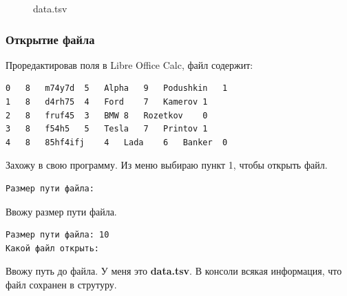 \begin{figure}[h]
    \caption{data.tsv}
    \label{fig:data-tsv-on-github}
\end{figure}


\subsubsection{Открытие файла}

Проредактировав поля в Libre Office Calc, файл содержит:

\begin{tcolorbox}
\begin{verbatim}
0	8	m74y7d	5	Alpha	9	Podushkin	1
1	8	d4rh75	4	Ford	7	Kamerov	1
2	8	fruf45	3	BMW	8	Rozetkov	0
3	8	f54h5	5	Tesla	7	Printov	1
4	8	85hf4ifj	4	Lada	6	Banker	0
\end{verbatim}
\end{tcolorbox}

Захожу в свою программу. Из меню выбираю пункт 1, чтобы открыть файл.

\begin{tcolorbox}
\begin{verbatim}
Размер пути файла: 
\end{verbatim}
\end{tcolorbox}

Ввожу размер пути файла.

\begin{tcolorbox}
\begin{verbatim}
Размер пути файла: 10
Какой файл открыть:     
\end{verbatim}
\end{tcolorbox}

Ввожу путь до файла. У меня это \textbf{data.tsv}. В консоли всякая информация, что файл сохранен в струтуру.

